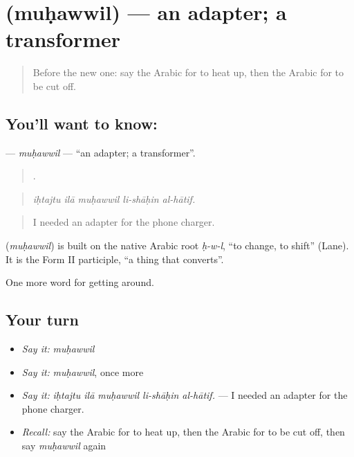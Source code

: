 \section[\texorpdfstring{\ar{محول} (muḥawwil)}{محول (muḥawwil)}]{ (muḥawwil) — an adapter; a transformer}

\label{lesson:AR-C444-muhawwil}



\begin{quote}
Before the new one: say the Arabic for to heat up, then the Arabic for to be cut off.
\end{quote}

\subsection*{You'll want to know: }
\textbf{} — \emph{muḥawwil} — \textquotedblleft{}an adapter; a transformer\textquotedblright{}.

\begin{quote}
    .
\end{quote}

\begin{quote}
\emph{iḥtajtu ilā muḥawwil li-shāḥin al-hātif.}
\end{quote}

\begin{quote}
I needed an adapter for the phone charger.
\end{quote}

\begin{cousinweb}
\textbf{} (\emph{muḥawwil}) is built on the native Arabic root \emph{ḥ-w-l}, \textquotedblleft{}to change, to shift\textquotedblright{} (Lane). It is the Form II participle, \textquotedblleft{}a thing that converts\textquotedblright{}.
\end{cousinweb}

\begin{grammarlens}[title={What you've built}]
One more word for getting around.
\end{grammarlens}

\subsection*{Your turn}
\begin{itemize}
\raggedright
  \item \emph{Say it:} \emph{muḥawwil}
  \item \emph{Say it:} \emph{muḥawwil}, once more
  \item \emph{Say it:} \emph{iḥtajtu ilā muḥawwil li-shāḥin al-hātif.} — I needed an adapter for the phone charger.
  \item \emph{Recall:} say the Arabic for to heat up, then the Arabic for to be cut off, then say \emph{muḥawwil} again
\end{itemize}

